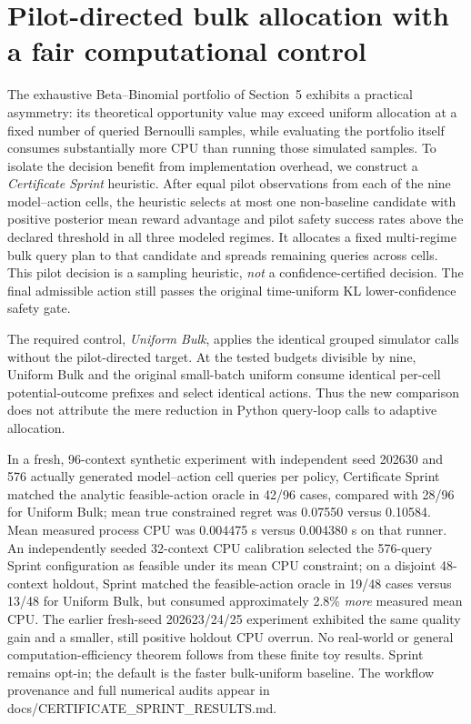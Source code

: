 \documentclass[11pt]{article}
\begin{document}
\section{Pilot-directed bulk allocation with a fair computational control}
The exhaustive Beta--Binomial portfolio of Section~5 exhibits a practical asymmetry: its theoretical opportunity value may exceed uniform allocation at a fixed number of queried Bernoulli samples, while evaluating the portfolio itself consumes substantially more CPU than running those simulated samples. To isolate the decision benefit from implementation overhead, we construct a \emph{Certificate Sprint} heuristic. After equal pilot observations from each of the nine model--action cells, the heuristic selects at most one non-baseline candidate with positive posterior mean reward advantage and pilot safety success rates above the declared threshold in all three modeled regimes. It allocates a fixed multi-regime bulk query plan to that candidate and spreads remaining queries across cells. This pilot decision is a sampling heuristic, \emph{not} a confidence-certified decision. The final admissible action still passes the original time-uniform KL lower-confidence safety gate.

The required control, \emph{Uniform Bulk}, applies the identical grouped simulator calls without the pilot-directed target. At the tested budgets divisible by nine, Uniform Bulk and the original small-batch uniform consume identical per-cell potential-outcome prefixes and select identical actions. Thus the new comparison does not attribute the mere reduction in Python query-loop calls to adaptive allocation.

In a fresh, 96-context synthetic experiment with independent seed 202630 and 576 actually generated model--action cell queries per policy, Certificate Sprint matched the analytic feasible-action oracle in 42/96 cases, compared with 28/96 for Uniform Bulk; mean true constrained regret was 0.07550 versus 0.10584. Mean measured process CPU was 0.004475 s versus 0.004380 s on that runner. An independently seeded 32-context CPU calibration selected the 576-query Sprint configuration as feasible under its mean CPU constraint; on a disjoint 48-context holdout, Sprint matched the feasible-action oracle in 19/48 cases versus 13/48 for Uniform Bulk, but consumed approximately 2.8\% \emph{more} measured mean CPU. The earlier fresh-seed 202623/24/25 experiment exhibited the same quality gain and a smaller, still positive holdout CPU overrun. No real-world or general computation-efficiency theorem follows from these finite toy results. Sprint remains opt-in; the default is the faster bulk-uniform baseline. The workflow provenance and full numerical audits appear in docs/CERTIFICATE_SPRINT_RESULTS.md.
\end{document}
